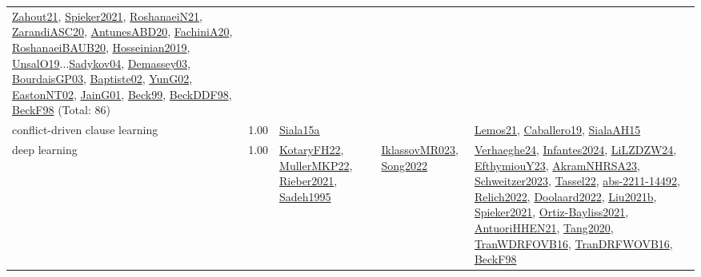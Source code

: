 {\begin{longtable}{p{3cm}r>{\raggedright\arraybackslash}p{6cm}>{\raggedright\arraybackslash}p{6cm}>{\raggedright\arraybackslash}p{8cm}}
\hyperref[detail:Zahout21]{Zahout21}, \hyperref[detail:Spieker2021]{Spieker2021}, \hyperref[detail:RoshanaeiN21]{RoshanaeiN21}, \hyperref[detail:ZarandiASC20]{ZarandiASC20}, \hyperref[detail:AntunesABD20]{AntunesABD20}, \hyperref[detail:FachiniA20]{FachiniA20}, \hyperref[detail:RoshanaeiBAUB20]{RoshanaeiBAUB20}, \hyperref[detail:Hosseinian2019]{Hosseinian2019}, \hyperref[detail:UnsalO19]{UnsalO19}...\hyperref[detail:Sadykov04]{Sadykov04}, \hyperref[detail:Demassey03]{Demassey03}, \hyperref[detail:BourdaisGP03]{BourdaisGP03}, \hyperref[detail:Baptiste02]{Baptiste02}, \hyperref[detail:YunG02]{YunG02}, \hyperref[detail:EastonNT02]{EastonNT02}, \hyperref[detail:JainG01]{JainG01}, \hyperref[detail:Beck99]{Beck99}, \hyperref[detail:BeckDDF98]{BeckDDF98}, \hyperref[detail:BeckF98]{BeckF98} (Total: 86)\\
\index{conflict-driven clause learning}\index{Algorithms!conflict-driven clause learning}conflict-driven clause learning &  1.00 & \hyperref[detail:Siala15a]{Siala15a} &  & \hyperref[detail:Lemos21]{Lemos21}, \hyperref[detail:Caballero19]{Caballero19}, \hyperref[detail:SialaAH15]{SialaAH15}\\
\index{deep learning}\index{Algorithms!deep learning}deep learning &  1.00 & \hyperref[detail:KotaryFH22]{KotaryFH22}, \hyperref[detail:MullerMKP22]{MullerMKP22}, \hyperref[detail:Rieber2021]{Rieber2021}, \hyperref[detail:Sadeh1995]{Sadeh1995} & \hyperref[detail:IklassovMR023]{IklassovMR023}, \hyperref[detail:Song2022]{Song2022} & \hyperref[detail:Verhaeghe24]{Verhaeghe24}, \hyperref[detail:Infantes2024]{Infantes2024}, \hyperref[detail:LiLZDZW24]{LiLZDZW24}, \hyperref[detail:EfthymiouY23]{EfthymiouY23}, \hyperref[detail:AkramNHRSA23]{AkramNHRSA23}, \hyperref[detail:Schweitzer2023]{Schweitzer2023}, \hyperref[detail:Tassel22]{Tassel22}, \hyperref[detail:abs-2211-14492]{abs-2211-14492}, \hyperref[detail:Relich2022]{Relich2022}, \hyperref[detail:Doolaard2022]{Doolaard2022}, \hyperref[detail:Liu2021b]{Liu2021b}, \hyperref[detail:Spieker2021]{Spieker2021}, \hyperref[detail:Ortiz-Bayliss2021]{Ortiz-Bayliss2021}, \hyperref[detail:AntuoriHHEN21]{AntuoriHHEN21}, \hyperref[detail:Tang2020]{Tang2020}, \hyperref[detail:TranWDRFOVB16]{TranWDRFOVB16}, \hyperref[detail:TranDRFWOVB16]{TranDRFWOVB16}, \hyperref[detail:BeckF98]{BeckF98}\\

\end{longtable}}
